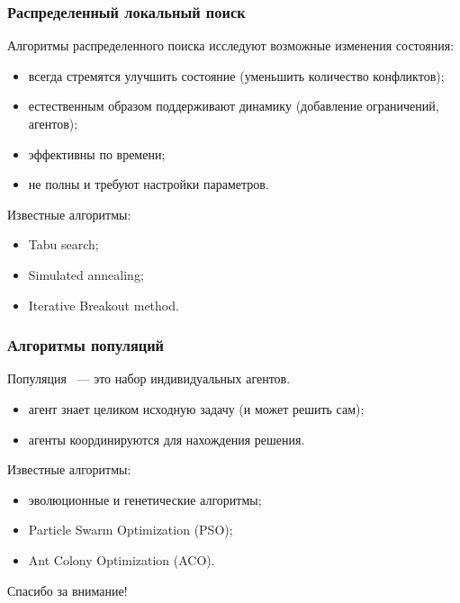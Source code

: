 \documentclass{beamer}
\begin{document}
\begin{frame}
  \frametitle{Распределенный локальный поиск}
  Алгоритмы распределенного поиска исследуют возможные изменения состояния:
  \begin{itemize}
    \item всегда стремятся улучшить состояние (уменьшить количество конфликтов);
    \item естественным образом поддерживают динамику (добавление ограничений, агентов);
    \item эффективны по времени;
    \item не полны и требуют настройки параметров.
  \end{itemize}

  Известные алгоритмы:
  \begin{itemize}
    \item Tabu search;
    \item Simulated annealing;
    \item Iterative Breakout method.
  \end{itemize}
\end{frame}

\begin{frame}
  \frametitle{Алгоритмы популяций}
  Популяция ~--- это набор индивидуальных агентов.
  \begin{itemize}
    \item агент знает целиком исходную задачу (и может решить сам);
    \item агенты координируются для нахождения решения.
  \end{itemize}

  Известные алгоритмы:
  \begin{itemize}
    \item эволюционные и генетические алгоритмы;
    \item Particle Swarm Optimization (PSO);
    \item Ant Colony Optimization (ACO).
  \end{itemize}
\end{frame}

\begin{frame}{}
\addtocounter{framenumber}{-1}
\begin{center}
\LARGE{Спасибо за внимание!}
\end{center}
\end{frame}
\end{document}
